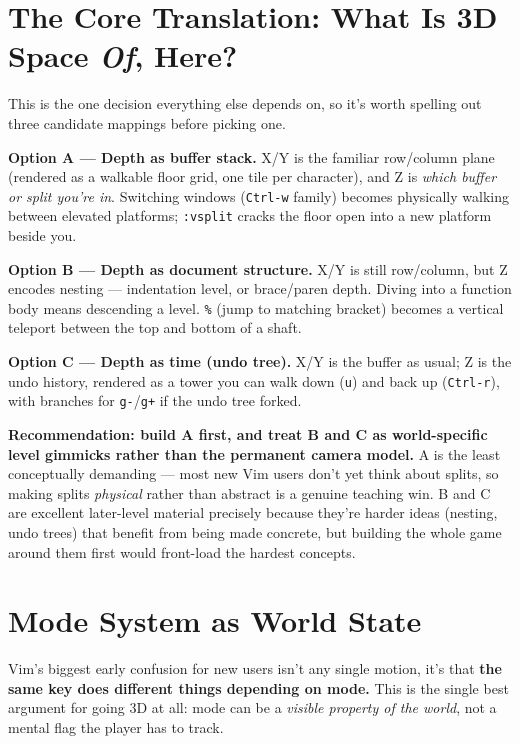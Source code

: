 \documentclass[11pt]{article}
\begin{document}
\hypertarget{sec-the-core-translation-what-is-3d-space-of-here}{%
\section{\texorpdfstring{The Core Translation: What Is 3D Space \emph{Of}, Here?}{The Core Translation: What Is 3D Space Of, Here?}}\label{sec-the-core-translation-what-is-3d-space-of-here}}

This is the one decision everything else depends on, so it's worth spelling
out three candidate mappings before picking one.

\textbf{Option A --- Depth as buffer stack.} X/Y is the familiar row/column plane
(rendered as a walkable floor grid, one tile per character), and Z is \emph{which
buffer or split you're in}. Switching windows (\texttt{Ctrl-w} family) becomes
physically walking between elevated platforms; \texttt{:vsplit} cracks the floor open
into a new platform beside you.

\textbf{Option B --- Depth as document structure.} X/Y is still row/column, but Z
encodes nesting --- indentation level, or brace/paren depth. Diving into a
function body means descending a level. \texttt{\%} (jump to matching bracket) becomes
a vertical teleport between the top and bottom of a shaft.

\textbf{Option C --- Depth as time (undo tree).} X/Y is the buffer as usual; Z is the
undo history, rendered as a tower you can walk down (\texttt{u}) and back up
(\texttt{Ctrl-r}), with branches for \texttt{g-}/\texttt{g+} if the undo tree forked.

\textbf{Recommendation: build A first, and treat B and C as world-specific level
gimmicks rather than the permanent camera model.} A is the least conceptually
demanding --- most new Vim users don't yet think about splits, so making splits
\emph{physical} rather than abstract is a genuine teaching win. B and C are
excellent later-level material precisely because they're harder ideas
(nesting, undo trees) that benefit from being made concrete, but building the
whole game around them first would front-load the hardest concepts.

\hypertarget{sec-mode-system-as-world-state}{%
\section{Mode System as World State}\label{sec-mode-system-as-world-state}}

Vim's biggest early confusion for new users isn't any single motion, it's that
\textbf{the same key does different things depending on mode.} This is the single
best argument for going 3D at all: mode can be a \emph{visible property of the
world}, not a mental flag the player has to track.
\end{document}
